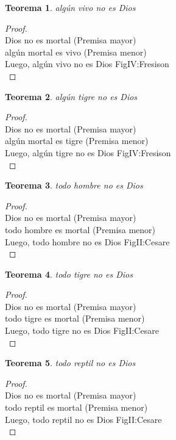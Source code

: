 ﻿\documentclass[12pt]{book}
\newtheorem{theorem}{Teorema}[chapter]
\newtheorem{proof}{Demostración}
\begin{document}
\begin{theorem}
algún vivo no es Dios
\label{th: 104}
\end{theorem}\begin{proof}\\Dios no es mortal	 (Premisa mayor) \\algún mortal es vivo	 (Premisa menor) \\Luego, algún vivo no es Dios	FigIV:Fresison \\ \end{proof}
\begin{theorem}
algún tigre no es Dios
\label{th: 105}
\end{theorem}\begin{proof}\\Dios no es mortal	 (Premisa mayor) \\algún mortal es tigre	 (Premisa menor) \\Luego, algún tigre no es Dios	FigIV:Fresison \\ \end{proof}
\begin{theorem}
todo hombre no es Dios
\label{th: 106}
\end{theorem}\begin{proof}\\Dios no es mortal	 (Premisa mayor) \\todo hombre es mortal	 (Premisa menor) \\Luego, todo hombre no es Dios	FigII:Cesare \\ \end{proof}
\begin{theorem}
todo tigre no es Dios
\label{th: 107}
\end{theorem}\begin{proof}\\Dios no es mortal	 (Premisa mayor) \\todo tigre es mortal	 (Premisa menor) \\Luego, todo tigre no es Dios	FigII:Cesare \\ \end{proof}
\begin{theorem}
todo reptil no es Dios
\label{th: 108}
\end{theorem}\begin{proof}\\Dios no es mortal	 (Premisa mayor) \\todo reptil es mortal	 (Premisa menor) \\Luego, todo reptil no es Dios	FigII:Cesare \\ \end{proof}
\end{document}
